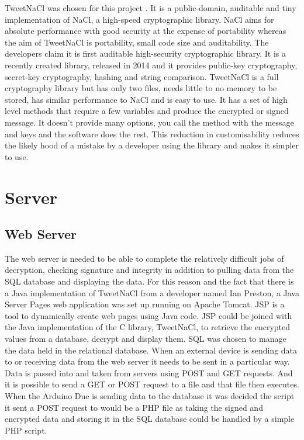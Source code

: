 
TweetNaCl was chosen for this project \cite{tweetdl}. It is a public-domain, auditable and tiny implementation of NaCl, a high-speed cryptographic library. NaCl aims for absolute performance with good security at the expense of portability whereas the aim of TweetNaCl is portability, small code size and auditability. The developers claim it is first auditable high-security cryptographic library. It is a recently created library, released in 2014 and it provides public-key cryptography, secret-key cryptography, hashing and string comparison. TweetNaCl is a full cryptography library but has only two files, needs little to no memory to be stored, has similar performance to NaCl and is easy to use. It has a set of high level methods that require a few variables and produce the encrypted or signed message. It doesn't provide many options, you call the method with the message and keys and the software does the rest. This reduction in customisability reduces the likely hood of a mistake by a developer using the library and makes it simpler to use.


\section{Server}

\subsection{Web Server}

The web server is needed to be able to complete the relatively difficult jobs of decryption, checking signature and integrity in addition to pulling data from the SQL database and displaying the data. For this reason and the fact that there is a Java implementation of TweetNaCl from a developer named Ian Preston, a Java Server Pages web application was set up running on Apache Tomcat. JSP is a tool to dynamically create web pages using Java code. JSP could be joined with the Java implementation of the C library, TweetNaCl, to retrieve the encrypted values from a database, decrypt and display them. SQL was chosen to manage the data held in the relational database. When an external device is sending data to or receiving data from the web server it needs to be sent in a particular way. Data is passed into and taken from servers using POST and GET requests. And it is possible to send a GET or POST request to a file and that file then executes. When the Arduino Due is sending data to the database it was decided the script it sent a POST request to would be a PHP file as taking the signed and encrypted data and storing it in the SQL database could be handled by a simple PHP script.


